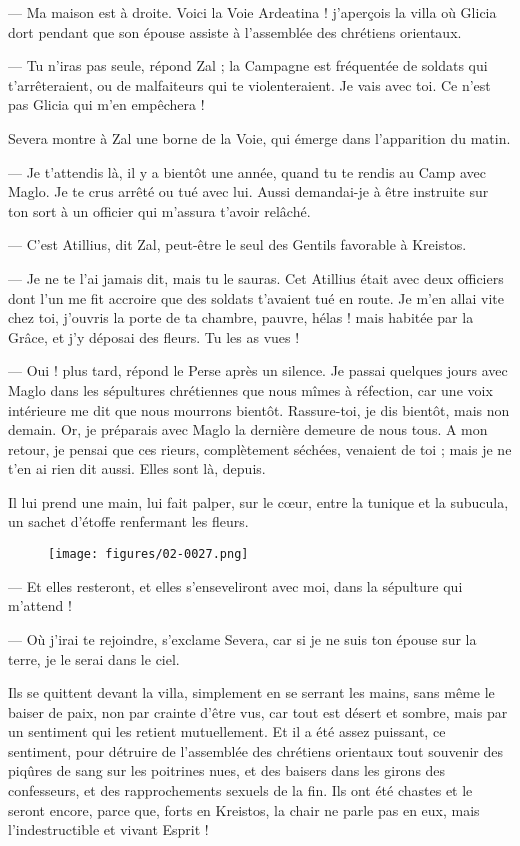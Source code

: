 \documentclass[a4paper, 11pt, oneside, polutonikogreek, french]{article}
\begin{document}
--- Ma maison est à droite. Voici la Voie Ardeatina ! j'aperçois la villa où Glicia dort pendant que son épouse assiste à l'assemblée des chrétiens orientaux.

--- Tu n'iras pas seule, répond Zal ; la Campagne est fréquentée de soldats qui t'arrêteraient, ou de malfaiteurs qui te violenteraient. Je vais avec toi. Ce n'est pas Glicia qui m'en empêchera !

Severa montre à Zal une borne de la Voie, qui émerge dans l'apparition du matin.

--- Je t'attendis là, il y a bientôt une année, quand tu te rendis au Camp avec Maglo. Je te crus arrêté ou tué avec lui. Aussi demandai-je à être instruite sur ton sort à un officier qui m'assura t'avoir relâché.

--- C'est Atillius, dit Zal, peut-être le seul des Gentils favorable à Kreistos.

--- Je ne te l'ai jamais dit, mais tu le sauras. Cet Atillius était avec deux officiers dont l'un me fit accroire que des soldats t'avaient tué en route. Je m'en allai vite chez toi, j'ouvris la porte de ta chambre, pauvre, hélas ! mais habitée par la Grâce, et j'y déposai des fleurs. Tu les as vues !

--- Oui ! plus tard, répond le Perse après un silence. Je passai quelques jours avec Maglo dans les sépultures chrétiennes que nous mîmes à réfection, car une voix intérieure me dit que nous mourrons bientôt. Rassure-toi, je dis bientôt, mais non demain. Or, je préparais avec Maglo la dernière demeure de nous tous. A mon retour, je pensai que ces rieurs, complètement séchées, venaient de toi ; mais je ne t'en ai rien dit aussi. Elles sont là, depuis.

Il lui prend une main, lui fait palper, sur le cœur, entre la tunique et la subucula, un sachet d'étoffe renfermant les fleurs.
\begin{figure}[H]
\centering
\texttt{[image: figures/02-0027.png]}
\end{figure}
--- Et elles resteront, et elles s'enseveliront avec moi, dans la sépulture qui m'attend !

--- Où j'irai te rejoindre, s'exclame Severa, car si je ne suis ton épouse sur la terre, je le serai dans le ciel.

Ils se quittent devant la villa, simplement en se serrant les mains, sans même le baiser de paix, non par crainte d'être vus, car tout est désert et sombre, mais par un sentiment qui les retient mutuellement. Et il a été assez puissant, ce sentiment, pour détruire de l'assemblée des chrétiens orientaux tout souvenir des piqûres de sang sur les poitrines nues, et des baisers dans les girons des confesseurs, et des rapprochements sexuels de la fin. Ils ont été chastes et le seront encore, parce que, forts en Kreistos, la chair ne parle pas en eux, mais l'indestructible et vivant Esprit !
\clearpage
\end{document}
